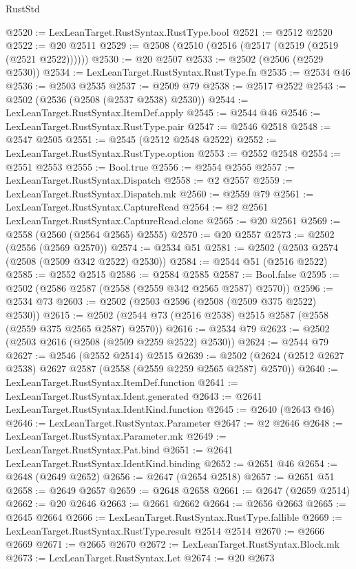 \begin{lexlean}{RustStd}
\begin{coremodule}
@2520 := LexLeanTarget.RustSyntax.RustType.bool
@2521 := @2512 @2520
@2522 := @20 @2511
@2529 := @2508 (@2510 (@2516 (@2517 (@2519 (@2519 (@2521 @2522))))))
@2530 := @20 @2507
@2533 := @2502 (@2506 (@2529 @2530))
@2534 := LexLeanTarget.RustSyntax.RustType.fn
@2535 := @2534 @46
@2536 := @2503 @2535
@2537 := @2509 @79
@2538 := @2517 @2522
@2543 := @2502 (@2536 (@2508 (@2537 @2538) @2530))
@2544 := LexLeanTarget.RustSyntax.ItemDef.apply
@2545 := @2544 @46
@2546 := LexLeanTarget.RustSyntax.RustType.pair
@2547 := @2546 @2518
@2548 := @2547 @2505
@2551 := @2545 (@2512 @2548 @2522)
@2552 := LexLeanTarget.RustSyntax.RustType.option
@2553 := @2552 @2548
@2554 := @2551 @2553
@2555 := Bool.true
@2556 := @2554 @2555
@2557 := LexLeanTarget.RustSyntax.Dispatch
@2558 := @2 @2557
@2559 := LexLeanTarget.RustSyntax.Dispatch.mk
@2560 := @2559 @79
@2561 := LexLeanTarget.RustSyntax.CaptureRead
@2564 := @2 @2561 LexLeanTarget.RustSyntax.CaptureRead.clone
@2565 := @20 @2561
@2569 := @2558 (@2560 (@2564 @2565) @2555)
@2570 := @20 @2557
@2573 := @2502 (@2556 (@2569 @2570))
@2574 := @2534 @51
@2581 := @2502 (@2503 @2574 (@2508 (@2509 @342 @2522) @2530))
@2584 := @2544 @51 (@2516 @2522)
@2585 := @2552 @2515
@2586 := @2584 @2585
@2587 := Bool.false
@2595 := @2502 (@2586 @2587 (@2558 (@2559 @342 @2565 @2587) @2570))
@2596 := @2534 @73
@2603 := @2502 (@2503 @2596 (@2508 (@2509 @375 @2522) @2530))
@2615 := @2502 (@2544 @73 (@2516 @2538) @2515 @2587 (@2558 (@2559 @375 @2565 @2587) @2570))
@2616 := @2534 @79
@2623 := @2502 (@2503 @2616 (@2508 (@2509 @2259 @2522) @2530))
@2624 := @2544 @79
@2627 := @2546 (@2552 @2514) @2515
@2639 := @2502 (@2624 (@2512 @2627 @2538) @2627 @2587 (@2558 (@2559 @2259 @2565 @2587) @2570))
@2640 := LexLeanTarget.RustSyntax.ItemDef.function
@2641 := LexLeanTarget.RustSyntax.Ident.generated
@2643 := @2641 LexLeanTarget.RustSyntax.IdentKind.function
@2645 := @2640 (@2643 @46)
@2646 := LexLeanTarget.RustSyntax.Parameter
@2647 := @2 @2646
@2648 := LexLeanTarget.RustSyntax.Parameter.mk
@2649 := LexLeanTarget.RustSyntax.Pat.bind
@2651 := @2641 LexLeanTarget.RustSyntax.IdentKind.binding
@2652 := @2651 @46
@2654 := @2648 (@2649 @2652)
@2656 := @2647 (@2654 @2518)
@2657 := @2651 @51
@2658 := @2649 @2657
@2659 := @2648 @2658
@2661 := @2647 (@2659 @2514)
@2662 := @20 @2646
@2663 := @2661 @2662
@2664 := @2656 @2663
@2665 := @2645 @2664
@2666 := LexLeanTarget.RustSyntax.RustType.fallible
@2669 := LexLeanTarget.RustSyntax.RustType.result @2514 @2514
@2670 := @2666 @2669
@2671 := @2665 @2670
@2672 := LexLeanTarget.RustSyntax.Block.mk
@2673 := LexLeanTarget.RustSyntax.Let
@2674 := @20 @2673

\end{coremodule}
\end{lexlean}
